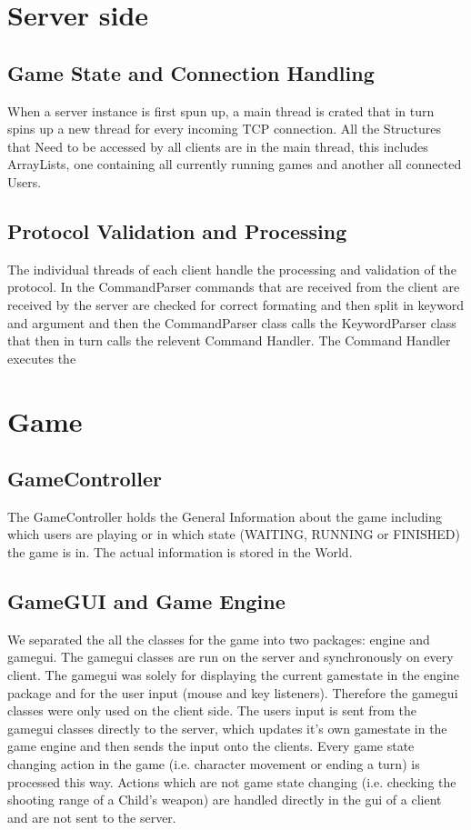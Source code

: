 \documentclass[11pt,a4paper]{article}
\begin{document}
		\subsection{}
	\section{Server side}
		\subsection{Game State and Connection Handling}
		When a server instance is first spun up, a main thread is crated that in turn spins up a new thread for every incoming TCP connection. All the Structures that Need to be accessed by all clients are in the main thread, this includes ArrayLists, one containing all currently running games and another all connected Users.
		\subsection{Protocol Validation and Processing}
		The individual threads of each client handle the processing and validation of the protocol. In the CommandParser commands that are received from the client are received by the server are checked for correct formating and then split in keyword and argument and then the CommandParser class calls the KeywordParser class that then in turn calls the relevent Command Handler. The Command Handler executes the  
		\subsection{}
	\section{Game}
		\subsection{GameController}
		The GameController holds the General Information about the game including which users are playing or in which state (WAITING, RUNNING or FINISHED) the game is in. The actual information is stored in the World.
		\subsection{GameGUI and Game Engine}
		We separated the all the classes for the game into two packages: engine and gamegui. The gamegui classes are run on the server and synchronously on every client. The gamegui was solely for displaying the current gamestate in the engine package and for the user input (mouse and key listeners). Therefore the gamegui classes were only used on the client side. The users input is sent from the gamegui classes directly to the server, which updates it's own gamestate in the game engine and then sends the input onto the clients. Every game state changing action in the game (i.e. character movement or ending a turn) is processed this way. Actions which are not game state changing (i.e. checking the shooting range of a Child's weapon) are handled directly in the gui of a client and are not sent to the server.
\end{document}
